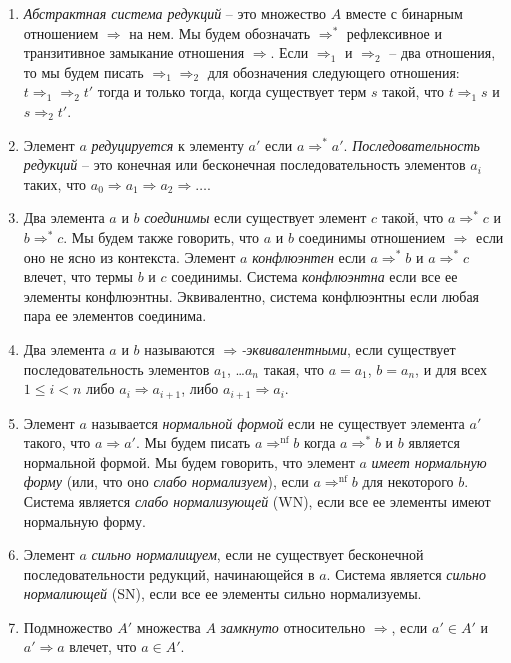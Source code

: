 \documentclass[reqno]{amsart}
\theoremstyle{definition}
\theoremstyle{remark}
\newcommand{\nf}{\mathrm{nf}}
\begin{document}
\begin{enumerate}
\item \emph{Абстрактная система редукций} -- это множество $A$ вместе с бинарным отношением $\Rightarrow$ на нем.
Мы будем обозначать $\Rightarrow^*$ рефлексивное и транзитивное замыкание отношения $\Rightarrow$.
Если $\Rightarrow_1$ и $\Rightarrow_2$ -- два отношения, то мы будем писать $\Rightarrow_1 \Rightarrow_2$ для обозначения следующего отношения:
$t \Rightarrow_1 \Rightarrow_2 t'$ тогда и только тогда, когда существует терм $s$ такой, что $t \Rightarrow_1 s$ и $s \Rightarrow_2 t'$.
\item Элемент $a$ \emph{редуцируется} к элементу $a'$ если $a \Rightarrow^* a'$.
\emph{Последовательность редукций} -- это конечная или бесконечная последовательность элементов $a_i$ таких, что $a_0 \Rightarrow a_1 \Rightarrow a_2 \Rightarrow \ldots$.
\item Два элемента $a$ и $b$ \emph{соединимы} если существует элемент $c$ такой, что $a \Rightarrow^* c$ и $b \Rightarrow^* c$.
Мы будем также говорить, что $a$ и $b$ соединимы отношением $\Rightarrow$ если оно не ясно из контекста.
Элемент $a$ \emph{конфлюэнтен} если $a \Rightarrow^* b$ и $a \Rightarrow^* c$ влечет, что термы $b$ и $c$ соединимы.
Система \emph{конфлюэнтна} если все ее элементы конфлюэнтны.
Эквивалентно, система конфлюэнтны если любая пара ее элементов соединима.
\item Два элемента $a$ и $b$ называются \emph{$\Rightarrow$-эквивалентными}, если существует последовательность элементов $a_1$, \ldots $a_n$ такая, что $a = a_1$, $b = a_n$,
и для всех $1 \leq i < n$ либо $a_i \Rightarrow a_{i+1}$, либо $a_{i+1} \Rightarrow a_i$.
\item Элемент $a$ называется \emph{нормальной формой} если не существует элемента $a'$ такого, что $a \Rightarrow a'$.
Мы будем писать $a \Rightarrow^\nf b$ когда $a \Rightarrow^* b$ и $b$ является нормальной формой.
Мы будем говорить, что элемент $a$ \emph{имеет нормальную форму} (или, что оно \emph{слабо нормализуем}), если $a \Rightarrow^\nf b$ для некоторого $b$.
Система является \emph{слабо нормализующей} (WN), если все ее элементы имеют нормальную форму.
\item Элемент $a$ \emph{сильно нормалищуем}, если не существует бесконечной последовательности редукций, начинающейся в $a$.
Система является \emph{сильно нормалиющей} (SN), если все ее элементы сильно нормализуемы.
\item Подмножество $A'$ множества $A$ \emph{замкнуто} относительно $\Rightarrow$, если $a' \in A'$ и $a' \Rightarrow a$ влечет, что $a \in A'$.
\end{enumerate}
\end{document}
